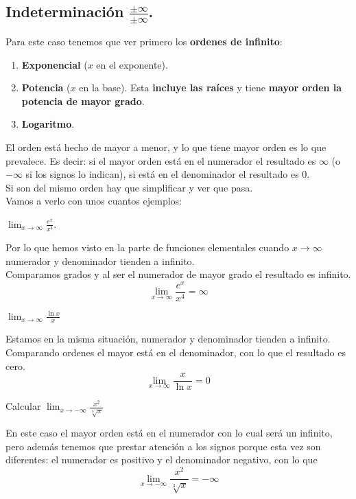 \documentclass[a4paper,11pt,answers]{exam}
\begin{document}
\subsection{Indeterminación $\boldsymbol{\frac{\pm\infty}{\pm\infty}}$.}
Para este caso tenemos que ver primero los \textbf{ordenes de infinito}:
\begin{enumerate}
	\item \textbf{Exponencial} ($x$ en el exponente).
	\item \textbf{Potencia} ($x$ en la base). Esta \textbf{incluye las raíces} y tiene \textbf{mayor orden la potencia de mayor grado}.
	\item \textbf{Logaritmo}.
\end{enumerate}
El orden está hecho de mayor a menor, y lo que tiene mayor orden  es lo que prevalece. Es decir: si el mayor orden está en el numerador el resultado es $\infty$ (o $-\infty$ si los signos lo indican), si está en el denominador el resultado es 0.\\
Si son del mismo orden hay que simplificar y ver que pasa.\\

Vamos a verlo con unos cuantos ejemplos:
\begin{questions}
\question $\lim_{x \to \infty} \frac{e^x}{x^4}$.
\begin{solution}
Por lo que hemos visto en la parte de funciones elementales cuando $x \to \infty$ numerador y denominador tienden a infinito.\\
Comparamos grados y al ser el numerador de mayor grado el resultado es infinito.
\[\lim_{x \to \infty} \frac{e^x}{x^4} = \infty\]
\end{solution}

\question $\lim_{x \to \infty} \frac{\ln x}{x}$
\begin{solution}
Estamos en la misma situación, numerador y denominador tienden a infinito. Comparando ordenes el mayor está en el denominador, con lo que el resultado es cero.
\[\lim_{x \to \infty} \frac{x}{\ln x} = 0\]
\end{solution}

\question Calcular $\lim_{x \to -\infty} \frac{x^2}{\sqrt[3]{x}}$
\begin{solution}
En este caso el mayor orden está en el numerador con lo cual será un infinito, pero además tenemos que prestar atención a los signos porque esta vez son diferentes: el numerador es positivo y el denominador negativo, con lo que
\[\lim_{x \to -\infty} \frac{x^2}{\sqrt[3]{x}} = -\infty\]

\end{solution}
\end{questions}
\end{document}
